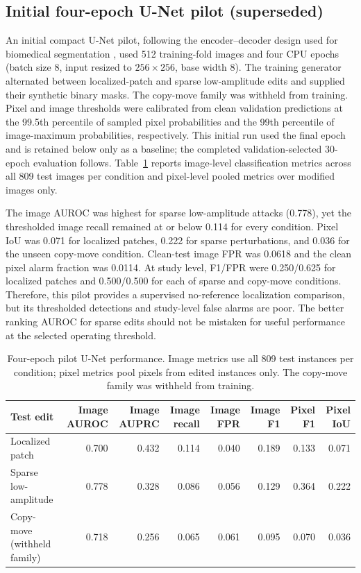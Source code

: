 \documentclass[journal]{IEEEtran}
\begin{document}
  \subsection{Initial four-epoch U-Net pilot (superseded)}
  An initial compact U-Net pilot, following the encoder--decoder design used for biomedical segmentation \cite{ronneberger2015}, used 512 training-fold images and four CPU epochs (batch size 8, input resized to $256\times256$, base width 8). The training generator alternated between localized-patch and sparse low-amplitude edits and supplied their synthetic binary masks. The copy-move family was withheld from training. Pixel and image thresholds were calibrated from clean validation predictions at the 99.5th percentile of sampled pixel probabilities and the 99th percentile of image-maximum probabilities, respectively. This initial run used the final epoch and is retained below only as a baseline; the completed validation-selected 30-epoch evaluation follows. Table~\ref{tab:unet} reports image-level classification metrics across all 809 test images per condition and pixel-level pooled metrics over modified images only.
  
  The image AUROC was highest for sparse low-amplitude attacks (0.778), yet the thresholded image recall remained at or below 0.114 for every condition. Pixel IoU was 0.071 for localized patches, 0.222 for sparse perturbations, and 0.036 for the unseen copy-move condition. Clean-test image FPR was 0.0618 and the clean pixel alarm fraction was 0.0114. At study level, F1/FPR were 0.250/0.625 for localized patches and 0.500/0.500 for each of sparse and copy-move conditions. Therefore, this pilot provides a supervised no-reference localization comparison, but its thresholded detections and study-level false alarms are poor. The better ranking AUROC for sparse edits should not be mistaken for useful performance at the selected operating threshold.
  
  \begin{table}[t]
  \caption{Four-epoch pilot U-Net performance. Image metrics use all 809 test instances per condition; pixel metrics pool pixels from edited instances only. The copy-move family was withheld from training.}
  \label{tab:unet}
  \centering\scriptsize
  \begin{tabular}{lrrrrrrr}
  \toprule
  Test edit & Image AUROC & Image AUPRC & Image recall & Image FPR & Image F1 & Pixel F1 & Pixel IoU \\
  \midrule
  Localized patch & 0.700 & 0.432 & 0.114 & 0.040 & 0.189 & 0.133 & 0.071 \\
  Sparse low-amplitude & 0.778 & 0.328 & 0.086 & 0.056 & 0.129 & 0.364 & 0.222 \\
  Copy-move (withheld family) & 0.718 & 0.256 & 0.065 & 0.061 & 0.095 & 0.070 & 0.036 \\
  \bottomrule
  \end{tabular}
  \end{table}
  
\end{document}
